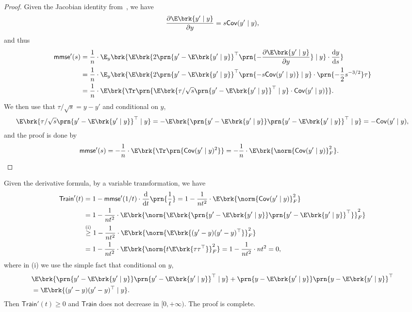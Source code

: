 \documentclass[11pt]{article}
\newcommand{\Cov}{\mathsf{Cov}}
\newcommand{\de}{\mathrm{d}}
\newcommand{\tfunc}{\mathsf{Train}}
\newcommand{\mmse}{\mathsf{mmse}}
\begin{document}
\begin{proof}
    Given the Jacobian identity from~\cite[Prop.~1]{dytso2020general}, we have 
    \begin{align*}
        \frac{\partial \E \brk{y' \mid y}}{\partial y} = s\Cov (y' \mid y),
    \end{align*}
    and thus
    \begin{align*}
        \mmse'(s) & = \frac{1}{n} \cdot \E_y\brk{\E \brk{2\prn{y' - \E \brk{y' \mid y}}^\top \prn{-\frac{\partial \E \brk{y' \mid y}}{\partial y}}  \mid y} \cdot \frac{\de y}{\de s}}\\
        & = \frac{1}{n} \cdot \E_y\brk{\E \brk{2\prn{y' - \E \brk{y' \mid y}}^\top \prn{-s \Cov(y' \mid y)}  \mid y} \cdot \prn{-\frac{1}{2} s^{-3/2}} \tau}\\
        & = \frac{1}{n} \cdot \E \brk{\Tr \prn{\E \brk{\tau/\sqrt{s} \prn{y' - \E \brk{y' \mid y}}^\top \mid y} \cdot \Cov(y' \mid y)} }.
    \end{align*}
    We then use that $\tau/\sqrt{s} = y-y'$ and conditional on $y$,
    \begin{align*}
        \E \brk{\tau/\sqrt{s} \prn{y' - \E \brk{y' \mid y}}^\top \mid y} = -\E \brk{\prn{y' - \E \brk{y' \mid y}}\prn{y' - \E \brk{y' \mid y}}^\top \mid y} = - \Cov(y' \mid y),
    \end{align*}
    and the proof is done by
    \begin{align*}
    \mmse'(s) & = - \frac{1}{n} \cdot \E \brk{\Tr \prn{\Cov(y' \mid y)^2}} = -\frac{1}{n} \cdot \E \brk{\norm{\Cov (y' \mid y)}_F^2}.
    \end{align*}
\end{proof}

Given the derivative formula, by a variable transformation, we have
\begin{align*}
    \tfunc'(t) & = 1 - \mmse'(1/t) \cdot \frac{\de }{\de t} \prn{\frac{1}{t}} = 1 - \frac{1}{nt^2} \cdot \E \brk{\norm{\Cov (y' \mid y)}_F^2 } \\
    & = 1 - \frac{1}{nt^2} \cdot \E \brk{\norm{\E \brk{\prn{y' - \E \brk{y' \mid y}}\prn{y' - \E \brk{y' \mid y}}^\top}}_F^2 } \\
    & \stackrel{\mathrm{(i)}}{\geq} 1 - \frac{1}{nt^2} \cdot \E \brk{\norm{\E \brk{(y' - y)(y' - y)^\top}}_F^2 } \nonumber \\
    & = 1 - \frac{1}{nt^2} \cdot \E \brk{\norm{t \E\brk{\tau \tau^\top}}_F^2 } = 1- \frac{1}{nt^2} \cdot nt^2 = 0,
\end{align*}
where in (i) we use the simple fact that conditional on $y$,
\begin{align*}
    &\E \brk{\prn{y' - \E \brk{y' \mid y}}\prn{y' - \E \brk{y' \mid y}}^\top \mid y} + \prn{y - \E \brk{y' \mid y}}\prn{y - \E \brk{y' \mid y}}^\top \nonumber \\
    &= \E \brk{(y' - y)(y' - y)^\top \mid y}.
\end{align*}
Then $\tfunc'(t) \geq 0$ and $\tfunc$ does not decrease in $[0, +\infty)$. The proof is complete.
\end{document}
